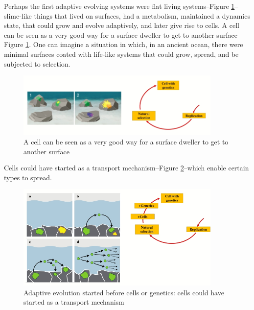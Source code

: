 \documentclass[]{article}
\begin{document}
Perhaps the first adaptive evolving systems were flat living systems--Figure \ref{fig:Baum2018}--slime-like things that lived on surfaces, had a metabolism, maintained a dynamics state, that could grow and evolve adaptively, and later give rise to cells. A cell can be seen as a very good way for a surface dweller to get to another surface--Figure \ref{fig:Baum2018}. One can imagine a situation in which, in an ancient ocean, there were minimal surfaces coated with life-like systems that could grow, spread, and be subjected to selection.

\begin{figure}[H]
	\caption[A very good way for a surface dweller to get to another surface]{ A cell can be seen as a very good way for a surface dweller to get to another surface\cite{baum2018origin}}\label{fig:Baum2018}
	\includegraphics[width=0.9\textwidth]{Baum2018}
\end{figure}

Cells could have started as a transport mechanism--Figure \ref{fig:Baum2015}--which enable certain types to spread.

\begin{figure}[H]
	\caption[Cells could have started as a transport mechanism]{Adaptive evolution started before cells or genetics: cells could have started as a transport mechanism\cite{baum2015selection}}\label{fig:Baum2015}
	\includegraphics[width=0.9\textwidth]{Baum2015}
\end{figure}
\end{document}
